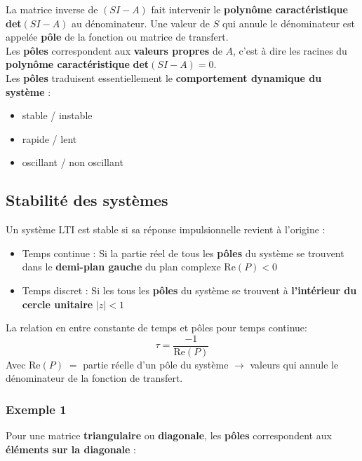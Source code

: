 \documentclass[document.tex]{subfiles}
\begin{document}
La matrice inverse de $(SI-A)$ fait intervenir le \textbf{polynôme caractéristique} \textbf{det$(SI-A)$} au dénominateur. Une valeur de $S$ qui annule le dénominateur est appelée \textbf{pôle} de la fonction ou matrice de transfert.\\

Les \textbf{pôles} correspondent aux \textbf{valeurs propres} de $A$, c'est à dire les racines du \textbf{polynôme caractéristique} \textbf{det$(SI-A) = 0$}.\\

Les \textbf{pôles} traduisent essentiellement le \textbf{comportement dynamique du système} :
\begin{itemize}
\item stable / instable
\item rapide / lent
\item oscillant / non oscillant
\end{itemize}

\subsection{Stabilité des systèmes}
Un système LTI est stable si sa réponse impulsionnelle revient à l'origine : \\
\begin{itemize}
	\item Temps continue : Si la partie réel de tous les \textbf{pôles} du système se trouvent dans le \textbf{demi-plan gauche} du plan complexe $\boxed{\text{Re}(P) < 0}$ 
	\item Temps discret : Si les tous les \textbf{pôles} du système se trouvent à \textbf{l'intérieur du cercle unitaire} $\boxed{\vert z \vert < 1}$
\end{itemize}
La relation en entre constante de temps et pôles pour temps continue:
\begin{equation}
	\tau = \frac{-1}{\text{Re}(P)}
\end{equation}
Avec $\text{Re}(P) \; =$ partie réelle d'un pôle du système $\rightarrow$ valeurs qui annule le dénominateur de la fonction de transfert.

\subsubsection{Exemple 1}
Pour une matrice \textbf{triangulaire} ou \textbf{diagonale}, les \textbf{pôles} correspondent aux \textbf{éléments sur la diagonale} :
\end{document}
